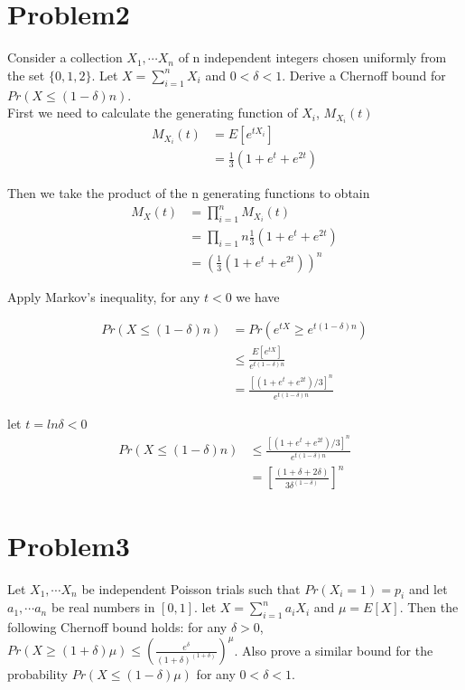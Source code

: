 \documentclass[12pt]{article}
\begin{document}
\section{Problem2}
Consider a collection $X_1, \cdots X_n$ of n independent integers chosen uniformly from the set $\{0,1,2\}$. Let $X=\sum_{i=1}^{n}X_i$ and $0 < \delta < 1$. Derive a Chernoff bound for $Pr(X \le (1-\delta)n)$.\\

First we need to calculate the generating function of $X_i$, $M_{X_i}(t)$
\begin{equation}
    \begin{split}
    M_{X_i}(t) &= E[e^{tX_i}] \\
    &= \frac{1}{3} (1+e^t+e^{2t})
    \end{split}
\end{equation}

Then we take the product of the n generating functions to obtain
\begin{equation}
    \begin{split}
    M_X(t) &= \prod_{i=1}^{n}M_{X_i}(t) \\
    &= \prod_{i=1}{n} \frac{1}{3} (1+e^t+e^{2t})\\
    &= (\frac{1}{3} (1+e^t+e^{2t}))^n
    \end{split}
\end{equation}

Apply Markov's inequality, for any $t<0$ we have

\begin{equation}
    \begin{split}
    Pr(X \le (1-\delta)n) &= Pr(e^{tX} \ge e^{t(1-\delta)n})\\
    &\le \frac{E[e^{tX}]}{e^{t(1-\delta)n}} \\
    &= \frac{[(1+e^t+e^{2t})/3]^n}{e^{t(1-\delta)n}}
    \end{split}
\end{equation}

let $t=ln\delta<0$
\begin{equation}
    \begin{split}
    Pr(X \le (1-\delta)n) &\le \frac{[(1+e^t+e^{2t})/3]^n}{e^{t(1-\delta)n}} \\
    &= [\frac{(1+\delta+2\delta)}{3\delta^{(1-\delta)}}]^n
    \end{split}
\end{equation}

\section{Problem3}
Let $X_1, \cdots X_n$ be independent Poisson trials such that $Pr(X_i = 1) = p_i$ and let $a_1, \cdots a_n$ be real numbers in $[0, 1]$. let $X = \sum_{i=1}^{n} a_iX_i$ and $\mu = E[X]$. Then the following Chernoff bound holds: for any $\delta > 0$, $Pr(X \ge (1+\delta) \mu) \le (\frac{e^\delta}{(1+\delta)^{(1+\delta)}})^\mu$. Also prove a similar bound for the probability $Pr(X \le (1-\delta)\mu)$ for any $0 < \delta < 1$.\\
\end{document}
